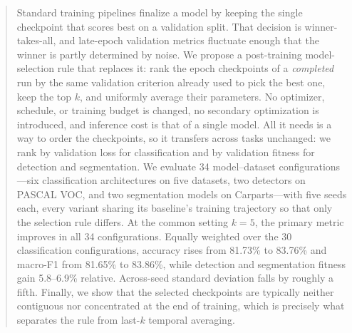\begin{abstract}
Standard training pipelines finalize a model by keeping the single checkpoint
that scores best on a validation split. That decision is winner-takes-all, and
late-epoch validation metrics fluctuate enough that the winner is partly
determined by noise. We propose a post-training model-selection rule that
replaces it: rank the epoch checkpoints of a \emph{completed} run by the same
validation criterion already used to pick the best one, keep the top $k$, and
uniformly average their parameters. No optimizer, schedule, or training budget
is changed, no secondary optimization is introduced, and inference cost is that
of a single model. All it needs is a way to order the checkpoints, so it transfers across tasks
unchanged: we rank by validation loss for classification and by validation
fitness for detection and segmentation.
We evaluate 34 model--dataset configurations---six classification
architectures on five datasets, two detectors on PASCAL VOC, and two
segmentation models on Carparts---with five seeds each, every variant sharing
its baseline's training trajectory so that only the selection rule differs. At
the common setting $k{=}5$, the primary metric improves in all 34
configurations. Equally weighted over the 30 classification configurations,
accuracy rises from 81.73\% to 83.76\% and macro-F1 from 81.65\% to 83.86\%,
while detection and segmentation fitness gain 5.8--6.9\% relative. Across-seed
standard deviation falls by roughly a fifth. Finally, we show that the selected
checkpoints are typically neither contiguous nor concentrated at the end of
training, which is precisely what separates the rule from last-$k$ temporal
averaging.
\end{abstract}
